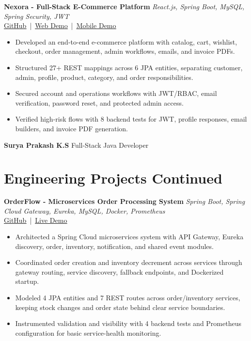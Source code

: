 \documentclass[a4paper,10pt]{article}
\newcommand{\resumeItem}[1]{\item \small{#1}}
\newcommand{\resumeLink}[2]{\href{#1}{\textcolor{linkblue}{\underline{#2}}}}
\newcommand{\projectHeader}[4]{
  \vspace{4pt}
  \textbf{#1} \hfill {\small \emph{#2}} \\
  {\footnotesize #3}
  \vspace{-1pt}
}
\begin{document}
\projectHeader
  {Nexora - Full-Stack E-Commerce Platform}
  {React.js, Spring Boot, MySQL, Spring Security, JWT}
  {\resumeLink{https://github.com/SURYAPRAKASH123671/nexora-ecommerce}{GitHub} \,|\, \resumeLink{https://nexora-web-virid.vercel.app/}{Web Demo} \,|\, \resumeLink{https://nexora-mobile.vercel.app/}{Mobile Demo}}
  {}
\begin{itemize}
  \resumeItem{Developed an end-to-end e-commerce platform with catalog, cart, wishlist, checkout, order management, admin workflows, emails, and invoice PDFs.}
  \resumeItem{Structured 27+ REST mappings across 6 JPA entities, separating customer, admin, profile, product, category, and order responsibilities.}
  \resumeItem{Secured account and operations workflows with JWT/RBAC, email verification, password reset, and protected admin access.}
  \resumeItem{Verified high-risk flows with 8 backend tests for JWT, profile responses, email builders, and invoice PDF generation.}
\end{itemize}
\vspace{2pt}

\newpage

\small \textbf{Surya Prakash K.S} \hfill Full-Stack Java Developer \\
\vspace{-4pt}
\section*{Engineering Projects Continued}

\projectHeader
  {OrderFlow - Microservices Order Processing System}
  {Spring Boot, Spring Cloud Gateway, Eureka, MySQL, Docker, Prometheus}
  {\resumeLink{https://github.com/SURYAPRAKASH123671/orderflow}{GitHub} \,|\, \resumeLink{https://orderflow-console-surya.vercel.app}{Live Demo}}
  {}
\begin{itemize}
  \resumeItem{Architected a Spring Cloud microservices system with API Gateway, Eureka discovery, order, inventory, notification, and shared event modules.}
  \resumeItem{Coordinated order creation and inventory decrement across services through gateway routing, service discovery, fallback endpoints, and Dockerized startup.}
  \resumeItem{Modeled 4 JPA entities and 7 REST routes across order/inventory services, keeping stock changes and order state behind clear service boundaries.}
  \resumeItem{Instrumented validation and visibility with 4 backend tests and Prometheus configuration for basic service-health monitoring.}
\end{itemize}
\vspace{0pt}
\end{document}
